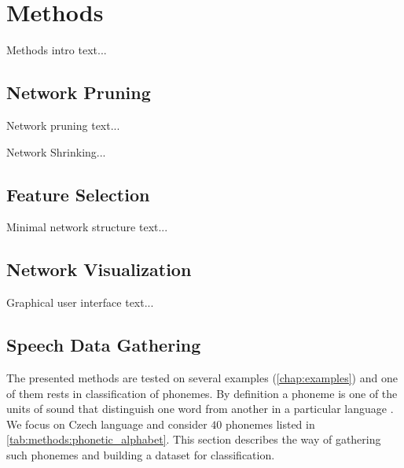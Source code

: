 \chapter{Methods} \label{chap:methods}
Methods intro text...

\section{Network Pruning} \label{sec:network_pruning}
Network pruning text...

Network Shrinking...

\section{Feature Selection} \label{sec:feature_selection}
Minimal network structure text...

\section{Network Visualization} \label{sec:network_visualization}
Graphical user interface text...

\newpage
\section{Speech Data Gathering} \label{sec:speech_data_gathering}
The presented methods are tested on several examples (\cref{chap:examples}) and one of them rests in classification of phonemes. By definition a phoneme is one of the units of sound that distinguish one word from another in a particular language \citep{wiki:mnist}. We focus on Czech language and consider $ 40 $ phonemes listed in \cref{tab:methods:phonetic_alphabet}. This section describes the way of gathering such phonemes and building a dataset for classification.

